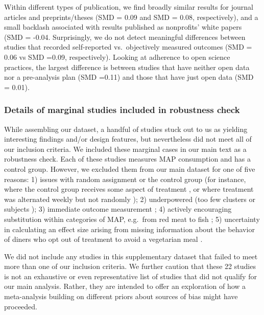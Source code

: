 \documentclass[sn-nature,referee,pdflatex]{sn-jnl}
\begin{document}
Within different types of publication, we find broadly similar results
for journal articles and preprints/theses (SMD = 0.09 and SMD = 0.08,
respectively), and a small backlash associated with results published as
nonprofits' white papers (SMD = -0.04. Surprisingly, we do not detect
meaningful differences between studies that recorded self-reported
vs.~objectively measured outcomes (SMD = 0.06 vs SMD =0.09,
respectively). Looking at adherence to open science practices, the
largest difference is between studies that have neither open data nor a
pre-analysis plan (SMD =0.11) and those that have just open data (SMD =
0.01).

\subsubsection{Details of marginal studies included in robustness
check}\label{details-of-marginal-studies-included-in-robustness-check}

While assembling our dataset, a handful of studies stuck out to us as
yielding interesting findings and/or design features, but nevertheless
did not meet all of our inclusion criteria. We included these marginal
cases in our main text as a robustness check. Each of these studies
measures MAP consumption and has a control group. However, we excluded
them from our main dataset for one of five reasons: 1) issues with
random assignment or the control group (for instance, where the control
group receives some aspect of treatment \citep{piazza2022}, or where
treatment was alternated weekly but not randomly \citep{garnett2020});
2) underpowered (too few clusters \citep{reinders2017} or subjects
\citep{lentz2019}); 3) immediate outcome measurement
\citep{dannenberg2023, sparkman2017, griesoph2021, hansen2021}; 4)
actively encouraging substitution within categories of MAP, e.g.~from
red meat to fish \citep{celis2017, johansen2009}; 5) uncertainty in
calculating an effect size arising from missing information about the
behavior of diners who opt out of treatment to avoid a vegetarian meal
\citep{betterfoodfoundation2023}.

We did not include any studies in this supplementary dataset that failed
to meet more than one of our inclusion criteria. We further caution that
these 22 studies is not an exhaustive or even representative list of
studies that did not qualify for our main analysis. Rather, they are
intended to offer an exploration of how a meta-analysis building on
different priors about sources of bias might have proceeded.
\end{document}
